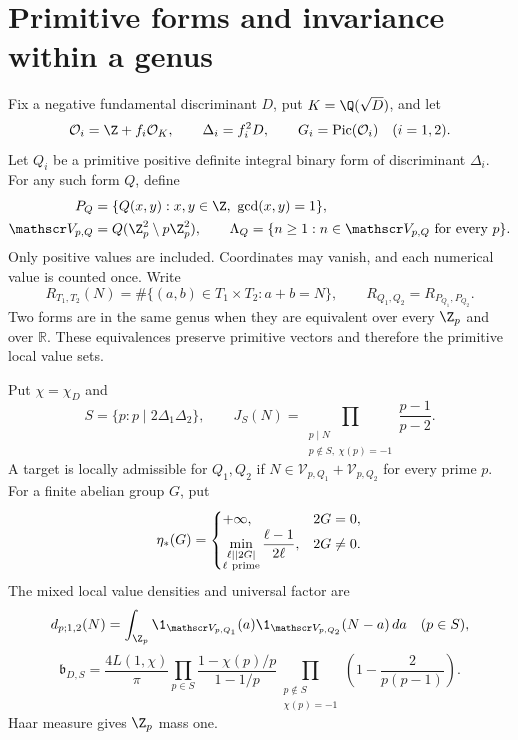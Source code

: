 \section{Primitive forms and invariance within a genus}\label{sec:forms}

Fix a negative fundamental discriminant \(D\), put \(K=\Q(\sqrt D)\),
and let
\[
 \mathcal O_i=\Z+f_i\mathcal O_K,\qquad
 \Delta_i=f_i^2D,\qquad G_i=\operatorname{Pic}(\mathcal O_i)
 \quad(i=1,2).
\]
Let \(Q_i\) be a primitive positive definite integral binary form of
discriminant \(\Delta_i\). For any such form \(Q\), define
\[
 \begin{aligned}
 P_Q&=\{Q(x,y):x,y\in\Z,\ \gcd(x,y)=1\},\\
 \mathscr V_{p,Q}&=Q(\Z_p^2\setminus p\Z_p^2),\qquad
 \Lambda_Q=\{n\ge1:n\in\mathscr V_{p,Q}\text{ for every }p\}.
 \end{aligned}
\]
Only positive values are included. Coordinates may vanish, and each
numerical value is counted once. Write
\[
 R_{T_1,T_2}(N)=\#\{(a,b)\in T_1\times T_2:a+b=N\},\qquad
 R_{Q_1,Q_2}=R_{P_{Q_1},P_{Q_2}}.
\]
Two forms are in the same genus when they are equivalent over every
\(\Z_p\) and over \(\mathbb R\). These equivalences preserve primitive
vectors and therefore the primitive local value sets.

Put \(\chi=\chi_D\) and
\[
 S=\{p:p\mid2\Delta_1\Delta_2\},\qquad
 J_S(N)=\prod_{\substack{p\mid N\\p\notin S,\ \chi(p)=-1}}
                              \frac{p-1}{p-2}.
\]
A target is locally admissible for \(Q_1,Q_2\) if
\(N\in\mathscr V_{p,Q_1}+\mathscr V_{p,Q_2}\) for every prime \(p\).
For a finite abelian group \(G\), put
\[
 \eta_*(G)=
 \begin{cases}
 +\infty,&2G=0,\\
 \displaystyle\min_{\substack{\ell\mid |2G|\\\ell\ {\rm prime}}}
                   \frac{\ell-1}{2\ell},&2G\ne0.
 \end{cases}
\]
The mixed local value densities and universal factor are
\[
 d_{p;1,2}(N)=\int_{\Z_p}
       \1_{\mathscr V_{p,Q_1}}(a)\1_{\mathscr V_{p,Q_2}}(N-a)\,da
       \quad(p\in S),
\]
\begin{equation}\label{eq:form-universal-factor}
 \mathfrak b_{D,S}=\frac{4L(1,\chi)}\pi
  \prod_{p\in S}\frac{1-\chi(p)/p}{1-1/p}
  \prod_{\substack{p\notin S\\\chi(p)=-1}}
                      \left(1-\frac2{p(p-1)}\right).
\end{equation}
Haar measure gives \(\Z_p\) mass one.

